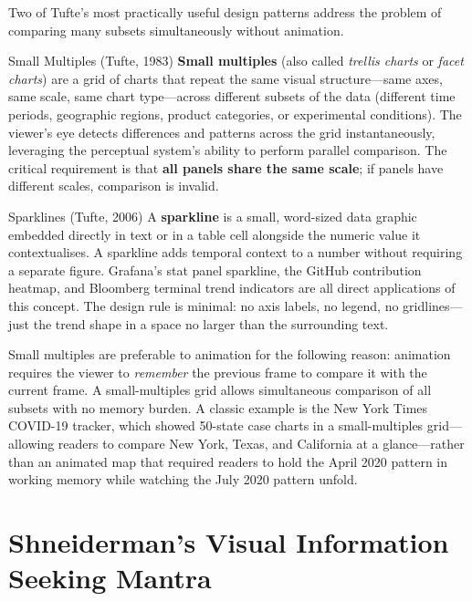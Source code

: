 Two of Tufte's most practically useful design patterns address the problem
of comparing many subsets simultaneously without animation.

\begin{defbox}{Small Multiples (Tufte, 1983)}
\textbf{Small multiples} (also called \emph{trellis charts} or
\emph{facet charts}) are a grid of charts that repeat the same visual
structure---same axes, same scale, same chart type---across different
subsets of the data (different time periods, geographic regions, product
categories, or experimental conditions). The viewer's eye detects
differences and patterns across the grid instantaneously, leveraging
the perceptual system's ability to perform parallel comparison.
The critical requirement is that \textbf{all panels share the same scale};
if panels have different scales, comparison is invalid.
\end{defbox}

\begin{defbox}{Sparklines (Tufte, 2006)}
A \textbf{sparkline} is a small, word-sized data graphic embedded
directly in text or in a table cell alongside the numeric value it
contextualises. A sparkline adds temporal context to a number without
requiring a separate figure. Grafana's stat panel sparkline, the GitHub
contribution heatmap, and Bloomberg terminal trend indicators are all
direct applications of this concept. The design rule is minimal: no axis
labels, no legend, no gridlines---just the trend shape in a space no
larger than the surrounding text.
\end{defbox}

Small multiples are preferable to animation for the following reason:
animation requires the viewer to \emph{remember} the previous frame to
compare it with the current frame. A small-multiples grid allows
simultaneous comparison of all subsets with no memory burden. A classic
example is the New York Times COVID-19 tracker, which showed 50-state
case charts in a small-multiples grid---allowing readers to compare New
York, Texas, and California at a glance---rather than an animated map
that required readers to hold the April 2020 pattern in working memory
while watching the July 2020 pattern unfold.

\section{Shneiderman's Visual Information Seeking Mantra}
\label{sec:shneiderman}

